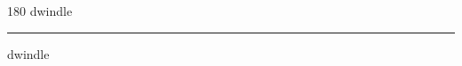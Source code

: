 
\begin{frame}
\begin{center}
\begin{turn}{180}
{\fontsize{2.5cm}{1em}\selectfont dwindle}
\end{turn}
\vspace{1em}\par  
\hrule
\vspace{1em}\par  
{\fontsize{2.5cm}{1em}\selectfont dwindle}
\end{center}
\end{frame}
